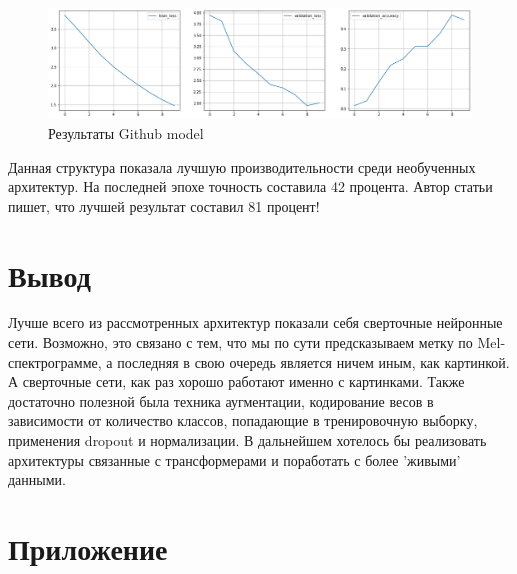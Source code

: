 \documentclass[a4paper,12pt]{article}
\begin{document}
 		\begin{figure}[H]
 		\centering
 		\includegraphics[width=1\linewidth]{Image/Github_model_train.png}
 		\caption{Результаты Github model}
 		\label{fig:githubmodel}
 	\end{figure}
 Данная структура показала лучшую производительности среди необученных архитектур. На последней эпохе точность составила 42 процента. Автор статьи пишет, что лучшей результат составил 81 процент!
 	\newpage
 	
 	\section{Вывод}
 	Лучше всего из рассмотренных архитектур показали себя сверточные нейронные сети. Возможно, это связано с тем, что мы по сути предсказываем метку по Mel-спектрограмме, а последняя в свою очередь является ничем иным, как картинкой. А сверточные сети, как раз хорошо работают именно с картинками. Также достаточно полезной была техника  аугментации, кодирование весов в зависимости от количество классов, попадающие в тренировочную выборку, применения dropout и нормализации. В дальнейшем хотелось бы реализовать архитектуры связанные с трансформерами и поработать с более 'живыми' данными. 
 	\newpage
 	
 	 	\section{Приложение}
 	
\end{document}
